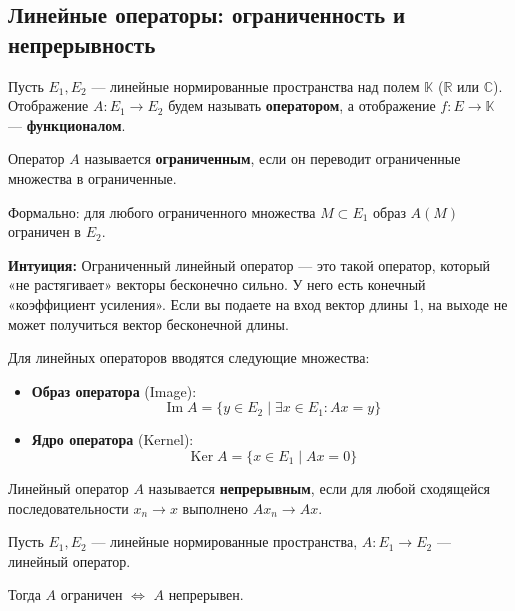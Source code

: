 
\subsection{Линейные операторы: ограниченность и непрерывность}

Пусть $E_1, E_2$ --- линейные нормированные пространства над полем $\mathbb{K}$ ($\mathbb{R}$ или $\mathbb{C}$).
Отображение $A: E_1 \to E_2$ будем называть \textbf{оператором}, а отображение $f: E \to \mathbb{K}$ --- \textbf{функционалом}.

\begin{definition}
	Оператор $A$ называется \textbf{ограниченным}, если он переводит ограниченные множества в ограниченные.
	
	Формально: для любого ограниченного множества $M \subset E_1$ образ $A(M)$ ограничен в $E_2$.
\end{definition}


\begin{idea}
	\textbf{Интуиция:} Ограниченный линейный оператор — это такой оператор, который «не растягивает» векторы бесконечно сильно. У него есть конечный «коэффициент усиления». Если вы подаете на вход вектор длины 1, на выходе не может получиться вектор бесконечной длины.
\end{idea}

\begin{definition}
	Для линейных операторов вводятся следующие множества:
	\begin{itemize}
		\item \textbf{Образ оператора} (Image):
		\[ \operatorname{Im} A = \{ y \in E_2 \mid \exists x \in E_1 : Ax = y\} \]
		\item \textbf{Ядро оператора} (Kernel):
		\[ \operatorname{Ker} A = \{ x \in E_1 \mid Ax = 0\} \]
	\end{itemize}
\end{definition}


\begin{definition}
	Линейный оператор $A$ называется \textbf{непрерывным}, если для любой сходящейся последовательности $x_n \to x$ выполнено $Ax_n \to Ax$.
\end{definition}


\begin{theorem}\label{thm:bounded_cont}
	Пусть $E_1, E_2$ --- линейные нормированные пространства, $A: E_1 \to E_2$ --- линейный оператор.
	
	Тогда $A$ ограничен $\iff$ $A$ непрерывен.
\end{theorem}

